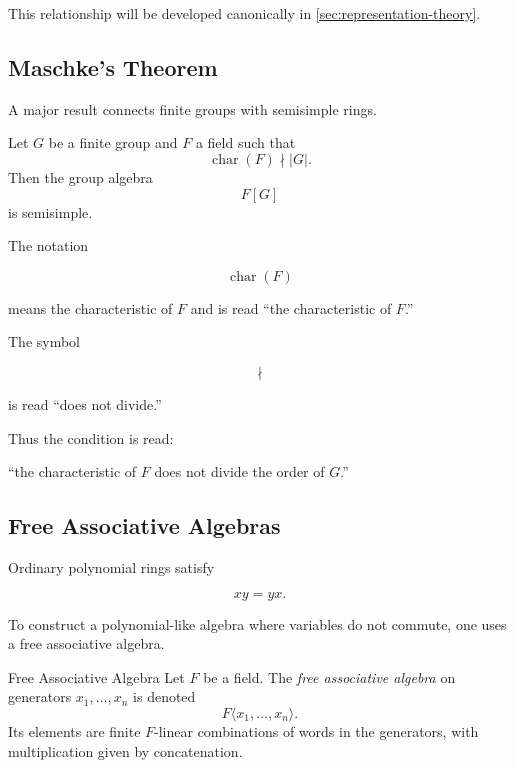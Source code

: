 This relationship will be developed canonically in
\cref{sec:representation-theory}.

\subsection{Maschke's Theorem}
\label{subsec:maschke-preview}

A major result connects finite groups with semisimple rings.

\begin{theorem}
Let \(G\) be a finite group and \(F\) a field such that
\[ \operatorname{char}(F)\nmid |G|. \]
Then the group algebra
\[ F[G] \]
is semisimple.
\end{theorem}

The notation

\[ \operatorname{char}(F) \]

means the characteristic of \(F\) and is read ``the characteristic of
\(F\).''

The symbol

\[ \nmid \]

is read ``does not divide.''

Thus the condition is read:

``the characteristic of \(F\) does not divide the order of \(G\).''

\subsection{Free Associative Algebras}
\label{subsec:free-associative-algebras}

Ordinary polynomial rings satisfy

\[ xy=yx. \]

To construct a polynomial-like algebra where variables do not commute, one
uses a free associative algebra.

\begin{definitionbox}{Free Associative Algebra}
Let \(F\) be a field. The \emph{free associative algebra} on generators
\(x_1,\ldots,x_n\) is denoted
\[ F\langle x_1,\ldots,x_n\rangle. \]
Its elements are finite \(F\)-linear combinations of words in the
generators, with multiplication given by concatenation.
\end{definitionbox}


